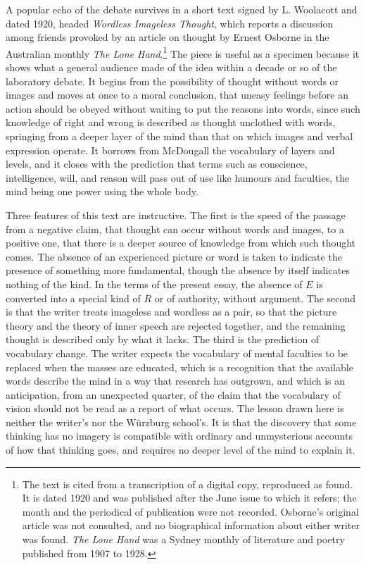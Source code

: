 \documentclass[11pt]{article}
\theoremstyle{remark}
\begin{document}
A popular echo of the debate survives in a short text signed by L. Woolacott and dated 1920, headed \emph{Wordless Imageless Thought}, which reports a discussion among friends provoked by an article on thought by Ernest Osborne in the Australian monthly \emph{The Lone Hand}.\footnote{The text is cited from a transcription of a digital copy, reproduced as found. It is dated 1920 and was published after the June issue to which it refers; the month and the periodical of publication were not recorded. Osborne's original article was not consulted, and no biographical information about either writer was found. \emph{The Lone Hand} was a Sydney monthly of literature and poetry published from 1907 to 1928.} The piece is useful as a specimen because it shows what a general audience made of the idea within a decade or so of the laboratory debate. It begins from the possibility of thought without words or images and moves at once to a moral conclusion, that uneasy feelings before an action should be obeyed without waiting to put the reasons into words, since such knowledge of right and wrong is described as thought unclothed with words, springing from a deeper layer of the mind than that on which images and verbal expression operate. It borrows from McDougall the vocabulary of layers and levels, and it closes with the prediction that terms such as conscience, intelligence, will, and reason will pass out of use like humours and faculties, the mind being one power using the whole body.

Three features of this text are instructive. The first is the speed of the passage from a negative claim, that thought can occur without words and images, to a positive one, that there is a deeper source of knowledge from which such thought comes. The absence of an experienced picture or word is taken to indicate the presence of something more fundamental, though the absence by itself indicates nothing of the kind. In the terms of the present essay, the absence of $E$ is converted into a special kind of $R$ or of authority, without argument. The second is that the writer treats imageless and wordless as a pair, so that the picture theory and the theory of inner speech are rejected together, and the remaining thought is described only by what it lacks. The third is the prediction of vocabulary change. The writer expects the vocabulary of mental faculties to be replaced when the masses are educated, which is a recognition that the available words describe the mind in a way that research has outgrown, and which is an anticipation, from an unexpected quarter, of the claim that the vocabulary of vision should not be read as a report of what occurs. The lesson drawn here is neither the writer's nor the W\"urzburg school's. It is that the discovery that some thinking has no imagery is compatible with ordinary and unmysterious accounts of how that thinking goes, and requires no deeper level of the mind to explain it.
\end{document}
